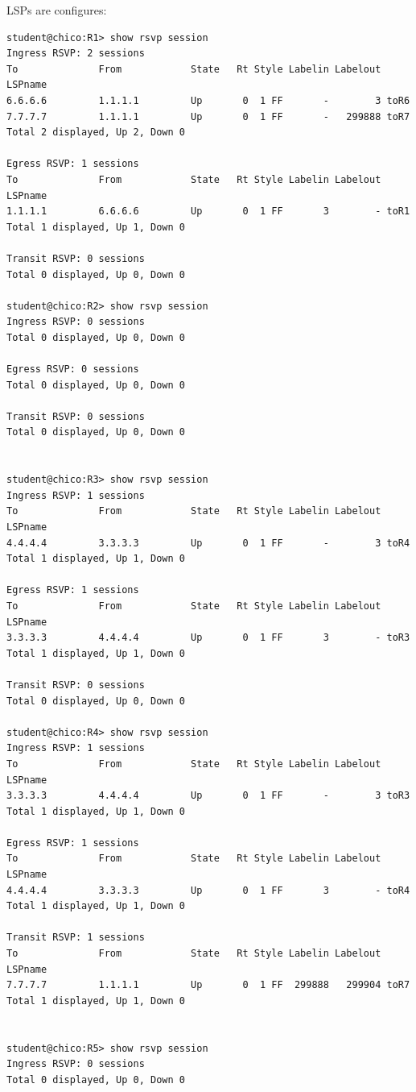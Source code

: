 \documentclass[a4paper]{article}
\begin{document}
LSPs are configures:

\begin{verbatim}
student@chico:R1> show rsvp session 
Ingress RSVP: 2 sessions
To              From            State   Rt Style Labelin Labelout LSPname 
6.6.6.6         1.1.1.1         Up       0  1 FF       -        3 toR6
7.7.7.7         1.1.1.1         Up       0  1 FF       -   299888 toR7
Total 2 displayed, Up 2, Down 0

Egress RSVP: 1 sessions
To              From            State   Rt Style Labelin Labelout LSPname 
1.1.1.1         6.6.6.6         Up       0  1 FF       3        - toR1
Total 1 displayed, Up 1, Down 0

Transit RSVP: 0 sessions
Total 0 displayed, Up 0, Down 0

student@chico:R2> show rsvp session 
Ingress RSVP: 0 sessions
Total 0 displayed, Up 0, Down 0

Egress RSVP: 0 sessions
Total 0 displayed, Up 0, Down 0

Transit RSVP: 0 sessions
Total 0 displayed, Up 0, Down 0


student@chico:R3> show rsvp session                          
Ingress RSVP: 1 sessions
To              From            State   Rt Style Labelin Labelout LSPname 
4.4.4.4         3.3.3.3         Up       0  1 FF       -        3 toR4
Total 1 displayed, Up 1, Down 0

Egress RSVP: 1 sessions
To              From            State   Rt Style Labelin Labelout LSPname 
3.3.3.3         4.4.4.4         Up       0  1 FF       3        - toR3
Total 1 displayed, Up 1, Down 0

Transit RSVP: 0 sessions
Total 0 displayed, Up 0, Down 0

student@chico:R4> show rsvp session            
Ingress RSVP: 1 sessions
To              From            State   Rt Style Labelin Labelout LSPname 
3.3.3.3         4.4.4.4         Up       0  1 FF       -        3 toR3
Total 1 displayed, Up 1, Down 0

Egress RSVP: 1 sessions
To              From            State   Rt Style Labelin Labelout LSPname 
4.4.4.4         3.3.3.3         Up       0  1 FF       3        - toR4
Total 1 displayed, Up 1, Down 0

Transit RSVP: 1 sessions
To              From            State   Rt Style Labelin Labelout LSPname 
7.7.7.7         1.1.1.1         Up       0  1 FF  299888   299904 toR7
Total 1 displayed, Up 1, Down 0


student@chico:R5> show rsvp session            
Ingress RSVP: 0 sessions
Total 0 displayed, Up 0, Down 0


\end{verbatim}
\end{document}
